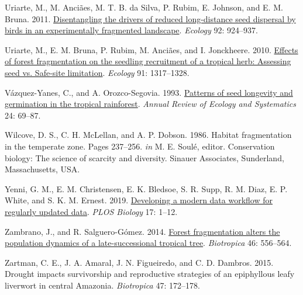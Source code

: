 \documentclass[
  12pt,
  man, donotrepeattitle,floatsintext]{apa6}
\newlength{\cslhangindent}
\newlength{\cslentryspacingunit} %
\newenvironment{CSLReferences}[2] %
 {%
  \setlength{\parindent}{0pt}
  \ifodd #1
  \let\oldpar\par
  \def\par{\hangindent=\cslhangindent\oldpar}
  \fi
  \setlength{\parskip}{#2\cslentryspacingunit}
 }%
 {}
\begin{document}
\begin{CSLReferences}{1}{0}
\leavevmode{}%
Uriarte, M., M. Anciães, M. T. B. da Silva, P. Rubim, E. Johnson, and E. M. Bruna. 2011. \href{https://doi.org/10.1890/10-0709.1}{Disentangling the drivers of reduced long-distance seed dispersal by birds in an experimentally fragmented landscape}. \emph{Ecology} 92: 924--937.

\leavevmode{}%
Uriarte, M., E. M. Bruna, P. Rubim, M. Anciães, and I. Jonckheere. 2010. \href{https://doi.org/10.1890/09-0785.1}{Effects of forest fragmentation on the seedling recruitment of a tropical herb: Assessing seed vs. Safe-site limitation}. \emph{Ecology} 91: 1317--1328.

\leavevmode{}%
Vázquez-Yanes, C., and A. Orozco-Segovia. 1993. \href{https://doi.org/10.1146/annurev.es.24.110193.000441}{Patterns of seed longevity and germination in the tropical rainforest}. \emph{Annual Review of Ecology and Systematics} 24: 69--87.

\leavevmode{}%
Wilcove, D. S., C. H. McLellan, and A. P. Dobson. 1986. Habitat fragmentation in the temperate zone. Pages 237--256. \emph{in} M. E. Soulé, editor. Conservation biology: {The} science of scarcity and diversity. Sinauer Associates, Sunderland, Massachusetts, USA.

\leavevmode{}%
Yenni, G. M., E. M. Christensen, E. K. Bledsoe, S. R. Supp, R. M. Diaz, E. P. White, and S. K. M. Ernest. 2019. \href{https://doi.org/10.1371/journal.pbio.3000125}{Developing a modern data workflow for regularly updated data}. \emph{PLOS Biology} 17: 1--12.

\leavevmode{}%
Zambrano, J., and R. Salguero-Gómez. 2014. \href{https://doi.org/10.1111/btp.12144}{Forest fragmentation alters the population dynamics of a late-successional tropical tree}. \emph{Biotropica} 46: 556--564.

\leavevmode{}%
Zartman, C. E., J. A. Amaral, J. N. Figueiredo, and C. D. Dambros. 2015. Drought impacts survivorship and reproductive strategies of an epiphyllous leafy liverwort in central {Amazonia}. \emph{Biotropica} 47: 172--178.

\end{CSLReferences}
\end{document}
